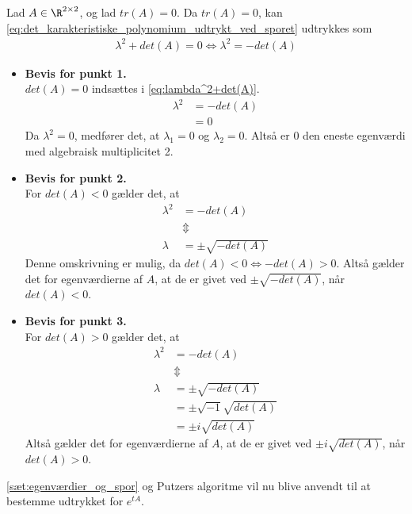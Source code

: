 \begin{bev} \textbf{} %
\newline
Lad $A\in \R^{2 \times 2}$, og lad $tr(A)=0$. Da $tr(A)=0$, kan \eqref{eq:det_karakteristiske_polynomium_udtrykt_ved_sporet} udtrykkes som 
\begin{align} \label{eq:lambda^2+det(A)}
    \lambda^2+det(A)=0 \Leftrightarrow \lambda^2=-det(A)
\end{align}
\begin{itemize}
    \item [] \textbf{Bevis for punkt 1.}\\
    $det(A)=0$ indsættes i \eqref{eq:lambda^2+det(A)}.
    \begin{align*}
        \lambda^2&=-det(A)\\
        &=0
    \end{align*}
    Da $\lambda^2=0$, medfører det, at $\lambda_1=0$ og $\lambda_2=0$. Altså er 0 den eneste egenværdi med algebraisk multiplicitet 2. 
    \item [] \textbf{Bevis for punkt 2.}\\
    For $det(A) < 0$ gælder det, at 
    \begin{align*}
        \lambda^2 &= -det(A)\\
        &\Updownarrow\\
        \lambda &= \pm \sqrt{-det(A)}
    \end{align*}
    Denne omskrivning er mulig, da $det(A)<0 \Leftrightarrow -det(A)>0$. Altså gælder det for egenværdierne af $A$, at de er givet ved $\pm \sqrt{-det(A)}$, når $det(A)<0$.
    \item [] \textbf{Bevis for punkt 3.}\\
    For $det(A) > 0$ gælder det, at
    \begin{align*}
        \lambda^2 &= -det(A)\\
        &\Updownarrow\\
        \lambda &= \pm \sqrt{-det(A)}\\
        &= \pm\sqrt{-1}\sqrt{det(A)}\\
        &= \pm i\sqrt{det(A)}
    \end{align*}
    Altså gælder det for egenværdierne af $A$, at de er givet ved $\pm i\sqrt{det(A)}$, når $det(A)>0$.
\end{itemize}
\end{bev}

\autoref{sæt:egenværdier_og_spor} og Putzers algoritme vil nu blive anvendt til at bestemme udtrykket for $e^{tA}$.

